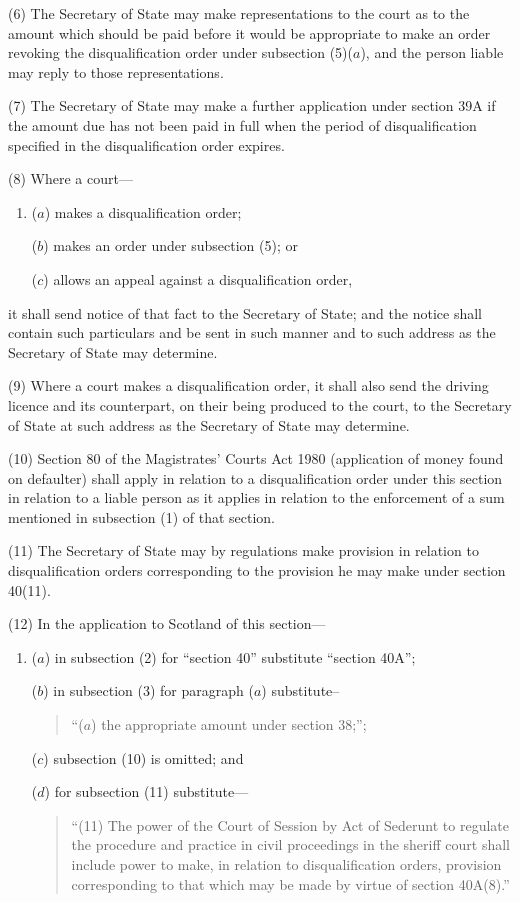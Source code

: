 \documentclass[a4paper]{article}
\begin{document}
(6)
The Secretary of State may make representations to the court as to the amount which should be paid before it would be appropriate to make an order revoking the disqualification order under subsection (5)($a$), and the person liable may reply to those representations.

(7)
The Secretary of State may make a further application under section 39A if the amount due has not been paid in full when the period of disqualification specified in the disqualification order expires.

(8)
Where a court---
\begin{enumerate}\item[]
($a$) makes a disqualification order;

($b$) makes an order under subsection (5); or

($c$) allows an appeal against a disqualification order,
\end{enumerate}
it shall send notice of that fact to the Secretary of State; and the notice shall contain such particulars and be sent in such manner and to such address as the Secretary of State may determine.

(9)
Where a court makes a disqualification order, it shall also send the driving licence and its counterpart, on their being produced to the court, to the Secretary of State at such address as the Secretary of State may determine.

(10)
Section 80 of the Magistrates’ Courts Act 1980 (application of money found on defaulter) shall apply in relation to a disqualification order under this section in relation to a liable person as it applies in relation to the enforcement of a sum mentioned in subsection (1) of that section.

(11)
The Secretary of State may by regulations make provision in relation to disqualification orders corresponding to the provision he may make under section 40(11).

(12)
In the application to Scotland of this section---
\begin{enumerate}\item[]
($a$) in subsection (2) for “section 40” substitute “section 40A”;

($b$) in subsection (3) for paragraph ($a$) substitute– 
\begin{quotation}
“($a$) the appropriate amount under section 38;”;
\end{quotation}

($c$) subsection (10) is omitted; and

($d$) for subsection (11) substitute---
\begin{quotation}
 “(11) The power of the Court of Session by Act of Sederunt to regulate the procedure and practice in civil proceedings in the sheriff court shall include power to make, in relation to disqualification orders, provision corresponding to that which may be made by virtue of section 40A(8).”
\end{quotation}
\end{enumerate}
\end{document}
